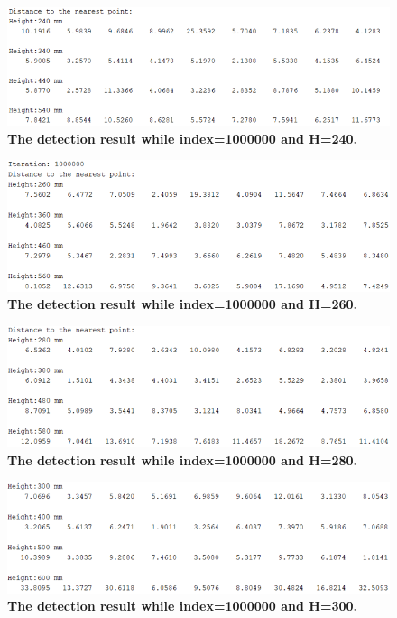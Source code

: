\begin{figure}[H] %
    \centering %
    \captionsetup{labelsep=colon}
    \includegraphics[width=0.65\linewidth]{Image/Code-Display/matlab_240.png}
    \caption[]
    {\centering \textbf{The detection result while index=1000000 and H=240.}}
    \label{fig:matlab_240}
\end{figure}
\begin{figure}[H] %
    \centering %
    \captionsetup{labelsep=colon}
    \includegraphics[width=0.65\linewidth]{Image/Code-Display/matlab_260.png}
    \caption[]
    {\centering \textbf{The detection result while index=1000000 and H=260.}}
    \label{fig:matlab_260}
\end{figure}
\begin{figure}[H] %
    \centering %
    \captionsetup{labelsep=colon}
    \includegraphics[width=0.65\linewidth]{Image/Code-Display/matlab_280.png}
    \caption[]
    {\centering \textbf{The detection result while index=1000000 and H=280.}}
    \label{fig:matlab_280}
\end{figure}
\begin{figure}[H] %
    \centering %
    \captionsetup{labelsep=colon}
    \includegraphics[width=0.65\linewidth]{Image/Code-Display/matlab_300.png}
    \caption[]
    {\centering \textbf{The detection result while index=1000000 and H=300.}}
    \label{fig:matlab_300}
\end{figure}

\newpage
